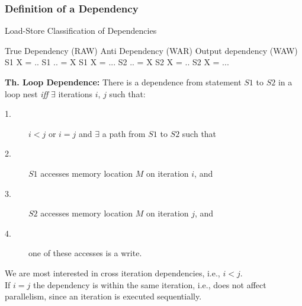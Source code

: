 \documentclass{beamer}
\begin{document}
\begin{frame}[fragile,t]
  \frametitle{Definition of a Dependency} %

\begin{block}{Load-Store Classification of Dependencies}
\begin{colorcode}
True Dependency (RAW)    Anti Dependency (WAR)    Output dependency (WAW)
S1    X  = ..            S1    .. = X             S1    X = ...            
S2    .. = X             S2    X  = ..            S2    X = ...
\end{colorcode}
\end{block} 

\smallskip

{\bf Th. Loop Dependence:} There is a dependence from statement $S1$ to $S2$
in a loop nest {\em iff} $\exists$ iterations $i$, $j$ such that:
\begin{description}
    \item[1.] $i < j$ or $i = j$ and $\exists$ a path from $S1$ to $S2$ such that
    \item[2.] $S1$ accesses memory location $M$ on iteration $i$, and
    \item[3.] $S2$ accesses memory location $M$ on iteration $j$, and
    \item[4.] one of these accesses is a write.
\end{description}

\bigskip

We are most interested in cross iteration dependencies, i.e., $i < j$.\\\smallskip
If $i = j$ the dependency is within the same iteration, i.e., 
does not affect parallelism, since an iteration is executed sequentially.


\end{frame}
\end{document}
